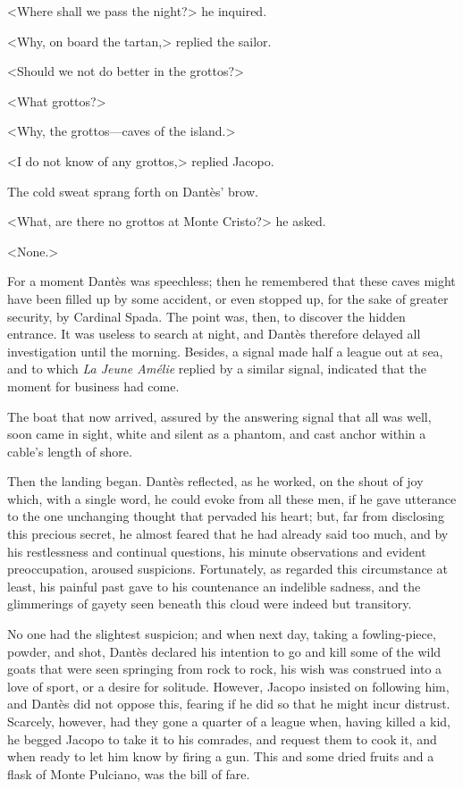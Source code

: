  <Where shall we pass the night?> he inquired. 

 <Why, on board the tartan,> replied the sailor. 

 <Should we not do better in the grottos?> 

 <What grottos?> 

 <Why, the grottos—caves of the island.> 

 <I do not know of any grottos,> replied Jacopo. 

 The cold sweat sprang forth on Dantès' brow. 

 <What, are there no grottos at Monte Cristo?> he asked. 

 <None.> 

 For a moment Dantès was speechless; then he remembered that these caves might have been filled up by some accident, or even stopped up, for the sake of greater security, by Cardinal Spada. The point was, then, to discover the hidden entrance. It was useless to search at night, and Dantès therefore delayed all investigation until the morning. Besides, a signal made half a league out at sea, and to which \textit{La Jeune Amélie} replied by a similar signal, indicated that the moment for business had come. 

 The boat that now arrived, assured by the answering signal that all was well, soon came in sight, white and silent as a phantom, and cast anchor within a cable's length of shore. 

 Then the landing began. Dantès reflected, as he worked, on the shout of joy which, with a single word, he could evoke from all these men, if he gave utterance to the one unchanging thought that pervaded his heart; but, far from disclosing this precious secret, he almost feared that he had already said too much, and by his restlessness and continual questions, his minute observations and evident preoccupation, aroused suspicions. Fortunately, as regarded this circumstance at least, his painful past gave to his countenance an indelible sadness, and the glimmerings of gayety seen beneath this cloud were indeed but transitory. 

 No one had the slightest suspicion; and when next day, taking a fowling-piece, powder, and shot, Dantès declared his intention to go and kill some of the wild goats that were seen springing from rock to rock, his wish was construed into a love of sport, or a desire for solitude. However, Jacopo insisted on following him, and Dantès did not oppose this, fearing if he did so that he might incur distrust. Scarcely, however, had they gone a quarter of a league when, having killed a kid, he begged Jacopo to take it to his comrades, and request them to cook it, and when ready to let him know by firing a gun. This and some dried fruits and a flask of Monte Pulciano, was the bill of fare. 

